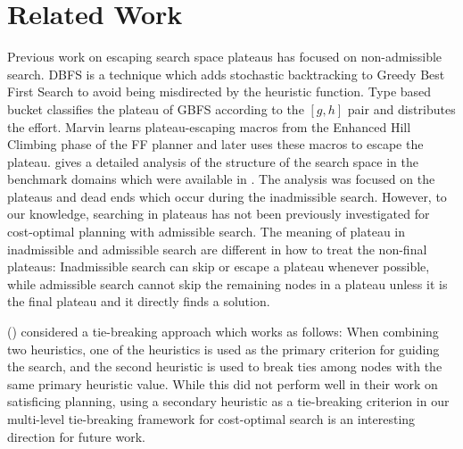 \section{Related Work}
\label{sec-4}

Previous work on escaping search space plateaus has focused on
non-admissible search.  DBFS \cite{imai2011novel} is a technique which
adds stochastic backtracking to Greedy Best First Search to avoid
being misdirected by the heuristic function. Type based bucket
\cite{xie14type} classifies the plateau of GBFS according to the
$[g,h]$ pair and distributes the effort.  Marvin \cite{Coles07} learns plateau-escaping macros
from the Enhanced Hill Climbing phase of the FF planner
\cite{Hoffmann01} and later uses these macros to escape the plateau.
\citeauthor{Hoffmann05} gives a detailed analysis of the
structure of the search space in the benchmark domains which were
available in \citeyear{Hoffmann05} \cite{Hoffmann05,Hoffmann14}. 
The analysis was focused on the plateaus and dead ends which occur during the inadmissible search.
% 
However, to our knowledge, searching in plateaus has not been
previously investigated for cost-optimal planning with admissible
search.
The meaning of plateau in inadmissible and admissible search are
different in how to treat the non-final plateaus: Inadmissible search can
skip or escape a plateau whenever possible, while
admissible search cannot skip the remaining nodes in a plateau unless it
is the final plateau and it directly finds a solution.

\citeauthor{RogerH10} (\citeyear{RogerH10}) considered a tie-breaking approach which works as follows:
When combining two heuristics, one of the
heuristics is used as the primary criterion for guiding the search,
and the second heuristic is used to break ties among nodes with the same primary
heuristic value.
While this did not perform well in their work on satisficing planning, 
using a secondary heuristic as a tie-breaking criterion in our multi-level tie-breaking framework 
for cost-optimal search is an interesting direction for future work.

